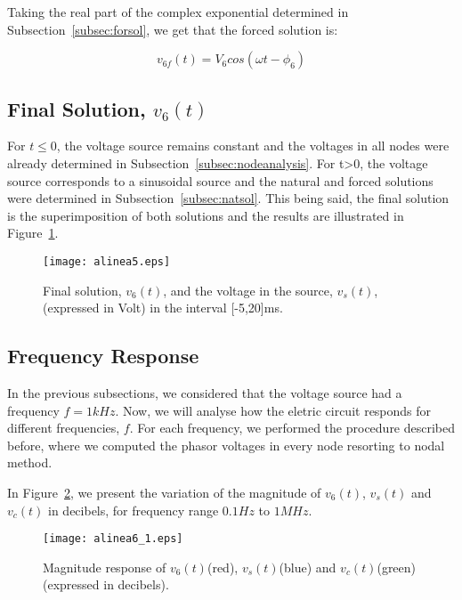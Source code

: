 Taking the real part of the complex exponential determined in Subsection~\ref{subsec:forsol}, we get that the forced solution is:

\begin{equation}
  v_{6f}(t) = V_6 cos(\omega t - \phi_6)
\end{equation}


\subsection{Final Solution, $v_6(t)$} \label{subsec:finsol}

For $t \leq 0$, the voltage source remains constant and the voltages in all nodes were already determined in Subsection~\ref{subsec:nodeanalysis}. For t>0, the voltage source corresponds to a sinusoidal source and the natural and forced solutions were determined in Subsection~\ref{subsec:natsol}. This being said, the final solution is the superimposition of both solutions and the results are illustrated in Figure~\ref{fig:finsol}.

\begin{figure}[H] \centering
\texttt{[image: alinea5.eps]}
\caption{Final solution, $v_{6}(t)$, and the voltage in the source, $v_s(t)$, (expressed in Volt) in the interval [-5,20]ms.}
\label{fig:finsol}
\end{figure}


\subsection{Frequency Response}

In the previous subsections, we considered that the voltage source had a frequency $f=1kHz$. Now, we will analyse how the eletric circuit responds for different frequencies, $f$. For each frequency, we performed the procedure described before, where we computed the phasor voltages in every node resorting to nodal method.

In Figure~\ref{fig:magnitude}, we present the variation of the magnitude of $v_6(t)$, $v_s(t)$ and $v_c(t)$ in decibels, for frequency range $0.1Hz$ to $1MHz$.

\begin{figure}[H] \centering
\texttt{[image: alinea6\_1.eps]}
\caption{Magnitude response of $v_6(t)$(red), $v_s(t)$(blue) and $v_c(t)$(green) (expressed in decibels).}
\label{fig:magnitude}
\end{figure}

